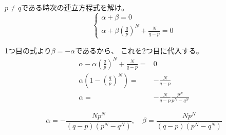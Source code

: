 \documentclass[12pt,b5paper]{ltjsarticle}
\begin{document}
\hrulefill

$p\ne q$である時次の連立方程式を解け。
\begin{equation}
 \begin{cases}
  \alpha + \beta =0 \\
  \alpha + \beta \left(\frac{q}{p}\right)^{N} + \frac{N}{q-p} =0
 \end{cases}
\end{equation}

\dotfill

1つ目の式より$\beta=-\alpha$であるから、
これを2つ目に代入する。
\begin{align}
 \alpha - \alpha \left(\frac{q}{p}\right)^{N} + \frac{N}{q-p} =& 0\\
 \alpha \left( 1 - \left(\frac{q}{p}\right)^{N} \right) =& - \frac{N}{q-p}\\
 \alpha =& - \frac{N}{q-p} \frac{p^{N}}{p^{N}-q^{N}}
\end{align}

\begin{equation}
 \alpha = - \frac{Np^{N}}{(q-p)(p^{N}-q^{N})}
  ,\quad
  \beta = \frac{Np^{N}}{(q-p)(p^{N}-q^{N})}
\end{equation}

\hrulefill

%
%
%
%
%
%
\end{document}
